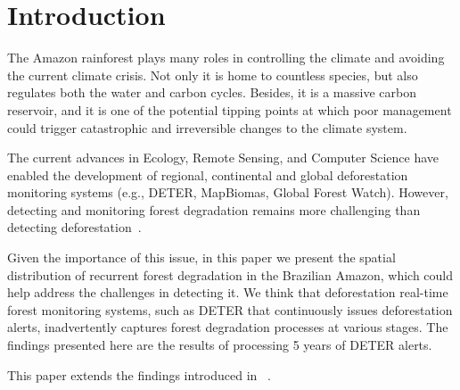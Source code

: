 \section{Introduction}

The Amazon rainforest plays many roles in controlling the climate and avoiding the current climate crisis.
Not only it is home to countless species, but also regulates both the water and carbon cycles.
Besides, it is a massive carbon reservoir, and it is one of the potential tipping points at which poor management could trigger catastrophic and irreversible
changes to the climate system.

The current advances in Ecology, Remote Sensing, and Computer Science have enabled the development of regional, continental and global deforestation monitoring systems (e.g., DETER, MapBiomas, Global Forest Watch).
However, detecting and monitoring forest degradation remains more challenging than detecting deforestation~\cite{Lambin:1999,Mitchell2017}.


Given the importance of this issue, in this paper we present the spatial distribution of recurrent forest degradation in the Brazilian Amazon, which could help address the challenges in detecting it. 
We think that deforestation real-time forest monitoring systems, such as DETER that continuously issues deforestation alerts, inadvertently captures forest degradation processes at various stages.
The findings presented here are the results of processing 5 years of DETER 
alerts.

This paper extends the findings introduced in ~\cite{sanchez2023}.
